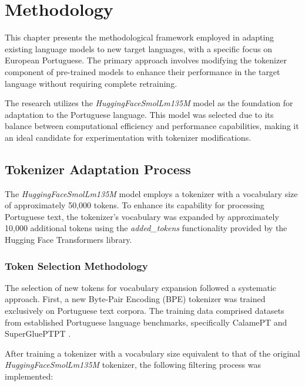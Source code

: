 
\chapter{Methodology}


\label{chap:methodology}

This chapter presents the methodological framework employed in adapting existing language models to new target languages, with a specific focus on European Portuguese. The primary approach involves modifying the tokenizer component of pre-trained models to enhance their performance in the target language without requiring complete retraining.

The research utilizes the \textit{HuggingFaceSmolLm135M} model as the foundation for adaptation to the Portuguese language. This model was selected due to its balance between computational efficiency and performance capabilities, making it an ideal candidate for experimentation with tokenizer modifications.

\section{Tokenizer Adaptation Process}
The \textit{HuggingFaceSmolLm135M} model employs a tokenizer with a vocabulary size of approximately 50,000 tokens. To enhance its capability for processing Portuguese text, the tokenizer's vocabulary was expanded by approximately 10,000 additional tokens using the \textit{added\_tokens} functionality provided by the Hugging Face Transformers library.

\subsection{Token Selection Methodology}
The selection of new tokens for vocabulary expansion followed a systematic approach. First, a new Byte-Pair Encoding (BPE) tokenizer was trained exclusively on Portuguese text corpora. The training data comprised datasets from established Portuguese language benchmarks, specifically CalamePT \cite{calamept} and SuperGluePTPT \cite{superglue_pt}.

After training a tokenizer with a vocabulary size equivalent to that of the original \textit{HuggingFaceSmolLm135M} tokenizer, the following filtering process was implemented:

